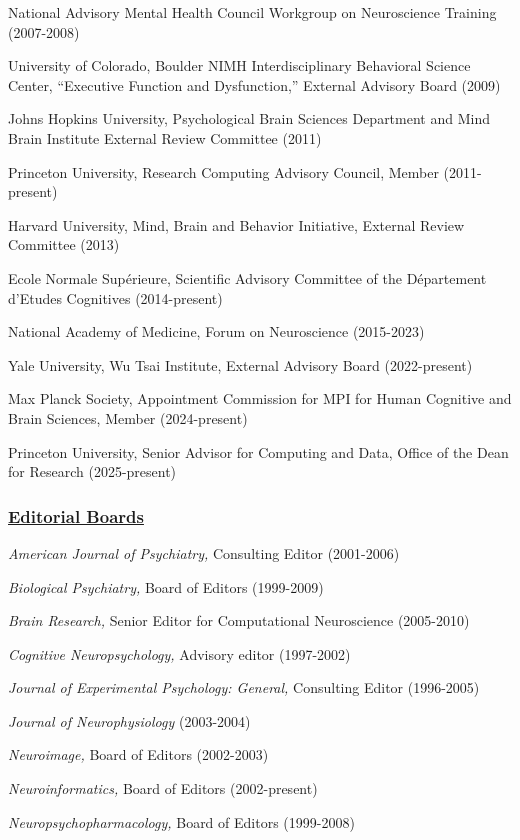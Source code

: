 \documentclass[10 pt]{article}
\begin{document}
National Advisory Mental Health Council Workgroup on Neuroscience Training (2007-2008)

University of Colorado, Boulder NIMH Interdisciplinary Behavioral Science Center, “Executive Function and Dysfunction,” External Advisory Board (2009)

Johns Hopkins University, Psychological Brain Sciences Department and Mind Brain Institute External Review Committee (2011)

Princeton University, Research Computing Advisory Council, Member (2011-present)

Harvard University, Mind, Brain and Behavior Initiative, External Review Committee (2013)

Ecole Normale Supérieure, Scientific Advisory Committee of the Département d'Etudes Cognitives (2014-present)

National Academy of Medicine, Forum on Neuroscience (2015-2023)

Yale University, Wu Tsai Institute, External Advisory Board (2022-present)

Max Planck Society, Appointment Commission for MPI for Human Cognitive and Brain Sciences, Member (2024-present)

Princeton University, Senior Advisor for Computing and Data, Office of the Dean for Research (2025-present)


\subsubsection*{\underline{Editorial Boards}} \label{secEB}
    \smallskip

\textit{American Journal of Psychiatry,} Consulting Editor (2001-2006)

\textit{Biological Psychiatry,} Board of Editors (1999-2009)

\textit{Brain Research,} Senior Editor for Computational Neuroscience (2005-2010)

\textit{Cognitive Neuropsychology,} Advisory editor (1997-2002)

\textit{Journal of Experimental Psychology: General,} Consulting Editor (1996-2005)

\textit{Journal of Neurophysiology} (2003-2004)

\textit{Neuroimage,} Board of Editors (2002-2003)

\textit{Neuroinformatics,} Board of Editors (2002-present)

\textit{Neuropsychopharmacology,} Board of Editors (1999-2008)
\end{document}
